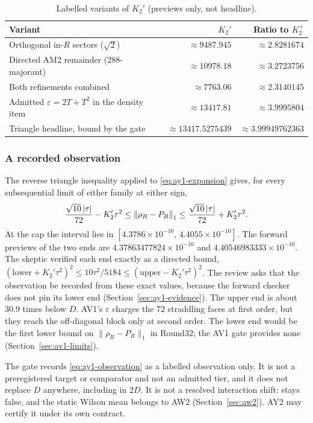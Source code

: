 \begin{table}[htbp]
\centering\small
\caption{Labelled variants of $K_2'$ (previews only, not headline).}
\label{tab:ay1-variants}
\begin{tabular}{lrr}
\toprule
Variant & $K_2'$ & Ratio to $K_2^+$\\
\midrule
Orthogonal in-$R$ sectors ($\sqrt2$) & $\approx9487.945$ & $\approx2.8281674$\\
Directed AM2 remainder ($288$-majorant) & $\approx10978.18$ & $\approx3.2723756$\\
Both refinements combined & $\approx7763.06$ & $\approx2.3140145$\\
Admitted $\varepsilon=2T+T^2$ in the density item & $\approx13417.81$ & $\approx3.9995804$\\
Triangle headline, bound by the gate & $\approx13417.5275439$ & $\approx3.99949762363$\\
\bottomrule
\end{tabular}
\end{table}

\subsubsection{A recorded observation}
\label{sec:ay1-observation}
The reverse triangle inequality applied to \eqref{eq:ay1-expansion} gives, for
every subsequential limit of either family at either sign,
\begin{equation}
 \frac{\sqrt{10}\,|\tau|}{72}-K_2'\tau^2\le\left\lVert\rho_R-P_R\right\rVert_1
 \le\frac{\sqrt{10}\,|\tau|}{72}+K_2'\tau^2 .
 \label{eq:ay1-observation}
\end{equation}
At the cap the interval lies in $[4.3786\times10^{-10},\,4.4055\times10^{-10}]$.
The forward previews of the two ends are $4.37863477824\times10^{-10}$ and
$4.40546983333\times10^{-10}$. The skeptic verified each end exactly as a
directed bound,
$(\text{lower}+K_2'\tau^2)^2\le10\tau^2/5184\le(\text{upper}-K_2'\tau^2)^2$.
The review asks that the observation be recorded from these exact values,
because the forward checker does not pin its lower end
(Section~\ref{sec:ay1-evidence}). The upper
end is about 30.9 times below $D$. AV1's $\varepsilon$ charges the 72
straddling faces at first order, but they reach the off-diagonal block only
at second order. The lower end would be the first lower bound on
$\lVert \rho_R-P_R\rVert_1$ in Round32; the AV1 gate provides none
(Section~\ref{sec:av1-limits}).

The gate records \eqref{eq:ay1-observation} as a labelled observation only.
It is not a preregistered target or comparator and not an admitted tier, and
it does not replace $D$ anywhere, including in $2D$. It is not a resolved
interaction shift:  stays false, and the
static Wilson mean belongs to AW2 (Section~\ref{sec:aw2}). AY2 may certify it
under its own contract.

